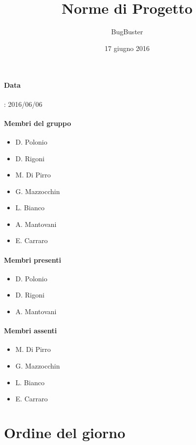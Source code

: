 



\title{\textbf{Norme di Progetto}}
\author{BugBuster}

\date{17 giugno 2016}



\makeFrontPage

\paragraph*{Data}: 2016/06/06

\paragraph*{Membri del gruppo}
\begin{itemize}

\item D. Polonio
\item D. Rigoni
\item M. Di Pirro
\item G. Mazzocchin
\item L. Bianco
\item A. Mantovani
\item E. Carraro
\end{itemize}

\paragraph*{Membri presenti}
\begin{itemize}
\item D. Polonio
\item D. Rigoni
\item A. Mantovani
\end{itemize}

\paragraph*{Membri assenti}
\begin{itemize}
\item M. Di Pirro
\item G. Mazzocchin
\item L. Bianco
\item E. Carraro
\end{itemize}

\section{Ordine del giorno}

